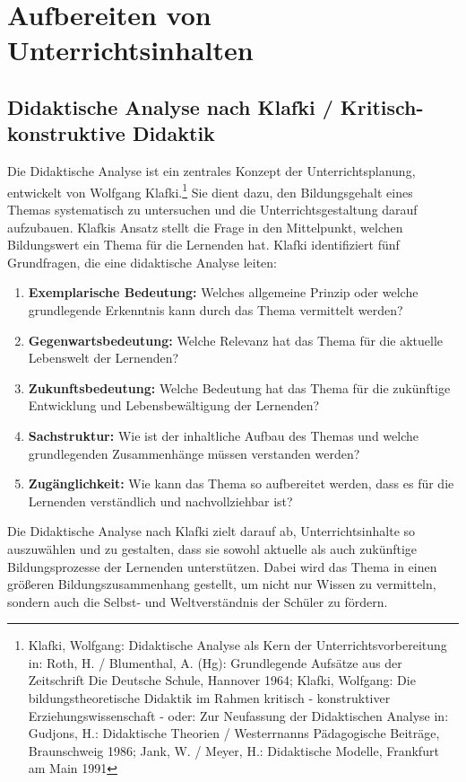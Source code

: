\chapter{Aufbereiten von Unterrichtsinhalten}\label{Aufbereitung}

\section{Didaktische Analyse nach Klafki / Kritisch-konstruktive Didaktik}

Die Didaktische Analyse ist ein zentrales Konzept der Unterrichtsplanung, entwickelt von Wolfgang Klafki.\footnote{Klafki, Wolfgang: Didaktische Analyse als Kern der Unterrichtsvorbereitung in: Roth, H. / Blumenthal, A. (Hg): Grundlegende Aufs\"{a}tze aus der Zeitschrift Die Deutsche Schule, Hannover 1964; Klafki, Wolfgang: Die bildungstheoretische Didaktik im Rahmen kritisch - konstruktiver Erziehungswissenschaft - oder: Zur Neufassung der Didaktischen Analyse in: Gudjons, H.: Didaktische Theorien / Westerrnanns P\"{a}dagogische Beitr\"{a}ge, Braunschweig 1986; Jank, W. / Meyer, H.: Didaktische Modelle, Frankfurt am Main 1991} Sie dient dazu, den Bildungsgehalt eines Themas systematisch zu untersuchen und die Unterrichtsgestaltung darauf aufzubauen. Klafkis Ansatz stellt die Frage in den Mittelpunkt, welchen Bildungswert ein Thema f\"{u}r die Lernenden hat.
\bip
Klafki identifiziert f\"{u}nf Grundfragen, die eine didaktische Analyse leiten:
\begin{enumerate}
\item{\textbf{Exemplarische Bedeutung:} Welches allgemeine Prinzip oder welche grundlegende Erkenntnis kann durch das Thema vermittelt werden?}
\item{\textbf{Gegenwartsbedeutung:} Welche Relevanz hat das Thema f\"{u}r die aktuelle Lebenswelt der Lernenden?}
\item{\textbf{Zukunftsbedeutung:} Welche Bedeutung hat das Thema f\"{u}r die zuk\"{u}nftige Entwicklung und Lebensbew\"{a}ltigung der Lernenden?}
\item{\textbf{Sachstruktur:} Wie ist der inhaltliche Aufbau des Themas und welche grundlegenden Zusammenh\"{a}nge m\"{u}ssen verstanden werden?}
\item{\textbf{Zug\"{a}nglichkeit:} Wie kann das Thema so aufbereitet werden, dass es f\"{u}r die Lernenden verst\"{a}ndlich und nachvollziehbar ist?}
\end{enumerate}

\bip

Die Didaktische Analyse nach Klafki zielt darauf ab, Unterrichtsinhalte so auszuw\"{a}hlen und zu gestalten, dass sie sowohl aktuelle als auch zuk\"{u}nftige Bildungsprozesse der Lernenden unterst\"{u}tzen. Dabei wird das Thema in einen gr\"{o}{\ss}eren Bildungszusammenhang gestellt, um nicht nur Wissen zu vermitteln, sondern auch die Selbst- und Weltverst\"{a}ndnis der Sch\"{u}ler zu f\"{o}rdern.

